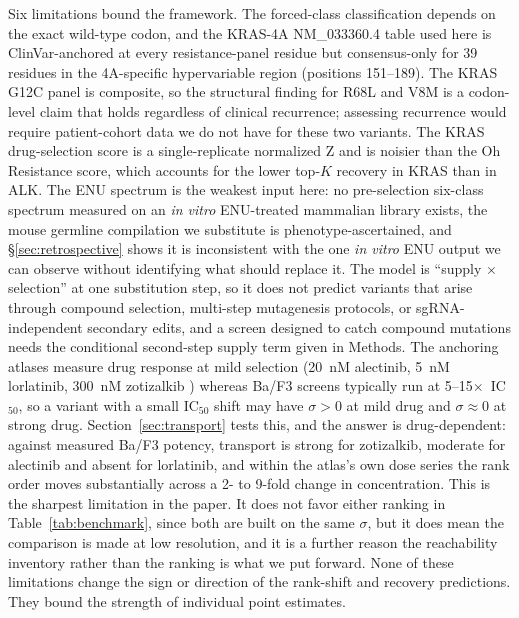 \documentclass[11pt,a4paper]{article}
\begin{document}
Six limitations bound the framework. The forced-class classification
depends on the exact wild-type codon, and the KRAS-4A NM\_033360.4
table used here is ClinVar-anchored at every resistance-panel residue
but consensus-only for 39 residues in the 4A-specific hypervariable
region (positions 151--189). The KRAS G12C panel is composite, so the
structural finding for R68L and V8M is a codon-level claim that holds
regardless of clinical recurrence; assessing recurrence would require
patient-cohort data we do not have for these two variants. The KRAS
drug-selection score is a single-replicate normalized Z and is noisier
than the Oh Resistance score, which accounts for the lower top-$K$
recovery in KRAS than in ALK. The ENU spectrum is the weakest input
here: no pre-selection six-class spectrum measured on an \textit{in
vitro} ENU-treated mammalian library exists, the mouse germline
compilation we substitute is phenotype-ascertained, and
\S\ref{sec:retrospective} shows it is inconsistent with the one
\textit{in vitro} ENU output we can observe without identifying what
should replace it. The model is ``supply $\times$ selection'' at one
substitution step, so it does not predict variants that arise through
compound selection, multi-step mutagenesis protocols, or
sgRNA-independent secondary edits, and a screen designed to catch
compound mutations needs the conditional second-step supply term given
in Methods. The anchoring atlases measure drug response at mild
selection (20~nM alectinib, 5~nM lorlatinib, 300~nM zotizalkib
\citep{oh2026}) whereas Ba/F3 screens typically run at
5--15$\times$~IC$_{50}$, so a variant with a small IC$_{50}$ shift may
have $\sigma > 0$ at mild drug and $\sigma \approx 0$ at strong drug.
Section~\ref{sec:transport} tests this, and the answer is drug-dependent:
against measured Ba/F3 potency, transport is strong for zotizalkib,
moderate for alectinib and absent for lorlatinib, and within the
atlas's own dose series the rank order moves substantially across a
2- to 9-fold change in concentration. This is the sharpest limitation
in the paper. It does not favor either ranking in
Table~\ref{tab:benchmark}, since both are built on the same $\sigma$,
but it does mean the comparison is made at low resolution, and it is a
further reason the reachability inventory rather than the ranking is
what we put forward. None
of these limitations change the sign or direction of the rank-shift and
recovery predictions. They bound the strength of individual point
estimates.
\end{document}
